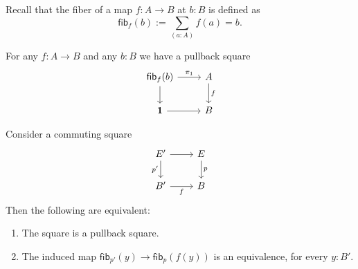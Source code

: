\documentclass[handout]{beamer}
\newcommand{\unit}{\mathbf{1}}
\newcommand{\fib}{\mathsf{fib}}
\begin{document}
\begin{frame}
  Recall that the fiber of a map $f:A\to B$ at $b:B$ is defined as
  \begin{equation*}
    \fib_f(b):=\sum_{(a:A)}f(a)=b.
  \end{equation*}

  \begin{corollary}
    For any $f:A\to B$ and any $b:B$ we have a pullback square
    \begin{equation*}
      \begin{tikzcd}[ampersand replacement=\&]
        \fib_f(b) \arrow[d] \arrow[r,"\pi_1"] \& A \arrow[d,"f"] \\
        \unit \arrow[r] \& B
      \end{tikzcd}
    \end{equation*}
  \end{corollary}
\end{frame}

\begin{frame}
  \begin{theorem}
    Consider a commuting square
    \begin{equation*}
      \begin{tikzcd}[ampersand replacement=\&]
        E' \arrow[d,swap,"{p'}"] \arrow[r] \& E \arrow[d,"p"] \\
        B' \arrow[r,swap,"f"] \& B
      \end{tikzcd}
    \end{equation*}
    Then the following are equivalent:
    \begin{enumerate}
    \item The square is a pullback square.
    \item The induced map $\fib_{p'}(y)\to \fib_p(f(y))$ is an equivalence, for every $y:B'$.
    \end{enumerate}
  \end{theorem}
\end{frame}
\end{document}
